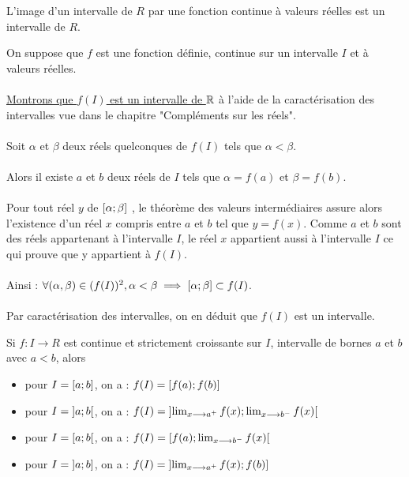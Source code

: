 \begin{defprop}
    L’image d’un intervalle de \(R\) par une fonction continue à valeurs réelles est un intervalle de \(R\).
\end{defprop}
\begin{dem}
    On suppose que \(f\) est une fonction définie, continue sur un intervalle \(I\) et à valeurs réelles.\\~\\
    \underline{Montrons que \(f (I)\) est un intervalle de \(\mathbb{R}\)} à l’aide de la caractérisation des intervalles vue dans le chapitre "Compléments sur les réels".\\~\\
    Soit \(\alpha\) et \(\beta\) deux réels quelconques de \(f (I)\) tels que \(\alpha < \beta\).\\~\\
    Alors il existe \(a\) et \(b\) deux réels de \(I\) tels que \(\alpha = f (a)\) et \(\beta = f (b)\).\\~\\
    Pour tout réel \(y\) de \(\left[\alpha;\beta\right]\) , le théorème des valeurs intermédiaires assure alors l’existence d’un réel \(x\) compris entre \(a\) et \(b\) tel que \(y = f (x)\). Comme \(a\) et \(b\) sont des réels appartenant à l’intervalle \(I\), le réel \(x\) appartient aussi à l’intervalle \(I\) ce qui prouve que y appartient à \(f (I)\).\\~\\
    Ainsi : \(\forall (\alpha, \beta) \in (f (I))^2 , \alpha < \beta \implies \left[\alpha;\beta\right] \subset f (I)\).\\~\\
    Par caractérisation des intervalles, on en déduit que \(f (I)\) est un intervalle.
\end{dem}

\begin{defprop}
    
Si \(f : I \to R\) est continue et strictement croissante sur \(I\), intervalle de bornes \(a\) et \(b\) avec \(a < b\), alors
\begin{itemize}
    \item  pour \(I = \left[a;b\right]\), on a : \(f(I) = \left[f(a);f(b)\right]\)
    \item  pour \(I = \left]a;b\right[\), on a : \(f(I) = \left]\lim_{x\longrightarrow a^+}f(x);\lim_{x\longrightarrow b^-}f(x)\right[\)
    \item  pour \(I = \left[a;b\right[\), on a : \(f(I) = \left[f(a);\lim_{x\longrightarrow b^-}f(x)\right[\)
    \item  pour \(I = \left]a;b\right]\), on a : \(f(I) = \left]\lim_{x\longrightarrow a^+}f(x);f(b)\right]\)
\end{itemize}
\end{defprop}
